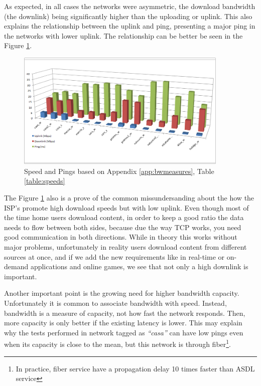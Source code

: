 As expected, in all cases the networks were asymmetric, 
the download bandwidth (the downlink) being significantly higher than the uploading
or uplink. This also explains the relationship between the uplink and ping,
presenting a major ping in the networks with lower uplink. The relationship
can be better be seen in the Figure \ref{fig:speeds}.

\begin{figure}[ht]
\centering
    \includegraphics[width=0.9\textwidth]{img/speed_graph}
\caption{Speed and Pings based on Appendix \ref{app:bwmeasures}, Table \ref{table:speeds}}
\label{fig:speeds}
\end{figure}%

The Figure \ref{fig:speeds} also is a prove of the common missundersanding
about the how the ISP's promote high download speeds but with low uplink. Even
though most of the time home users download content, in order to keep a good
ratio the data needs to flow between both sides, because due the way TCP
works, you need good communication in both directions. While in theory this
works without major problems, unfortunately in reality users download content
from different sources at once, and if we add the new requirements like in
real-time  or on-demand applications and online games, we see that not only a
high downlink is important.

Another important point is the growing need for higher bandwidth capacity.
Unfortunately it is common to associate bandwidth with speed. Instead,
bandwidth is a measure of capacity, not how fast the network responds. Then,
more capacity is only better if the existing latency is lower. This may
explain why the tests performed in network tagged as \textit{``casa''} can have low pings
even when its capacity is close to the mean, but this network is through
fiber\footnote{In practice, fiber service have a propagation delay 10 times
faster than ASDL service}.

